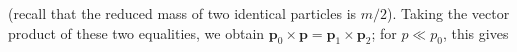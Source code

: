 (recall that the reduced mass of two identical particles is $m/2$). Taking the vector product of these two equalities, we obtain $\mathbf p_0\times\mathbf p=\mathbf p_1\times\mathbf p_2$; for $p\ll p_0$, this gives
